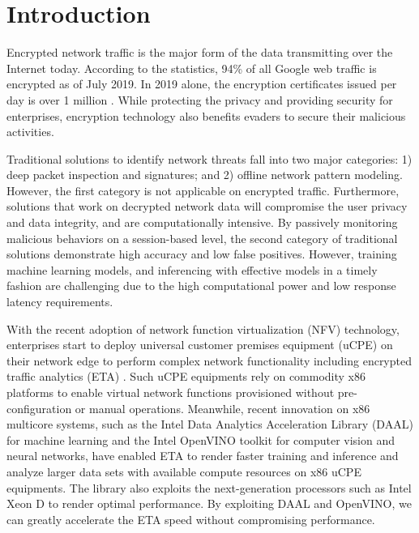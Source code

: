 \section{Introduction}
\label{sec:intro}

Encrypted network traffic is the major form of the data transmitting over the Internet today. According to the statistics, 94\% of all Google web traffic is encrypted \cite{google:https} as of July 2019. In 2019 alone, the encryption certificates issued per day is over 1 million \cite{letsencrypt}. While protecting the privacy and providing security for enterprises, encryption technology also benefits evaders to secure their malicious activities. 

Traditional solutions to identify network threats fall into two major categories: 1) deep packet inspection and signatures; and 2) offline network pattern modeling. However, the first category is not applicable on encrypted traffic. Furthermore, solutions that work on decrypted network data will compromise the user privacy and data integrity, and are computationally intensive. By passively monitoring malicious behaviors on a session-based level, the second category of traditional solutions \cite{Anderson:2016, Anderson:2017} demonstrate high accuracy and low false positives. However, training machine learning models, and inferencing with effective models in a timely fashion are challenging due to the high computational power and low response latency requirements.  

With the recent adoption of network function virtualization (NFV) technology, enterprises start to deploy universal customer premises equipment (uCPE) on their network edge to perform complex network functionality including encrypted traffic analytics (ETA) \cite{cisco:eta, intel:ucpe, adva:ucpe}. Such uCPE equipments rely on commodity x86 platforms to enable virtual network functions provisioned without pre-configuration or manual operations. Meanwhile, recent innovation on x86 multicore systems, such as the Intel Data Analytics Acceleration Library (DAAL) \cite{daal} for machine learning and the Intel OpenVINO toolkit \cite{openvino} for computer vision and neural networks, have enabled ETA to render faster training and inference and analyze larger data sets with available compute resources on x86 uCPE equipments. The library also exploits the next-generation processors such as Intel Xeon D \cite{xeond} to render optimal performance. By exploiting DAAL and OpenVINO, we can greatly accelerate the ETA speed without compromising performance.

